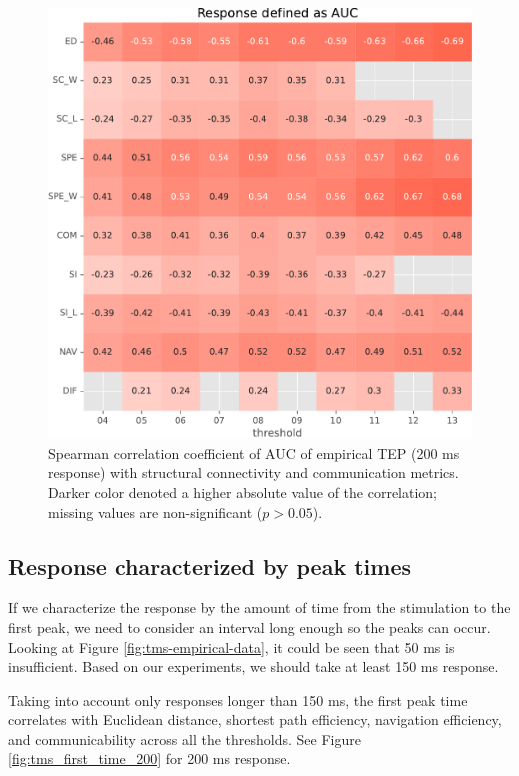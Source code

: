 \begin{figure}
    \centering
    \includegraphics[width=\textwidth]{images/nootebook_generated/pytepfit_results/empirical/200/not_over_threshold_nan/Response defined as AUC.pdf}
    \caption[TEPs AUC (200 ms) correlations]{Spearman correlation coefficient of AUC of empirical TEP (200 ms response) with structural connectivity and communication metrics. Darker color denoted a higher absolute value of the correlation; missing values are non-significant ($p>0.05$).}
    \label{fig:tms_auc_200}
\end{figure}

\subsection{Response characterized by peak times}

If we characterize the response by the amount of time from the stimulation to the first peak, we need to consider an interval long enough so the peaks can occur. Looking at Figure \ref{fig:tms-empirical-data}, it could be seen that 50 ms is insufficient. Based on our experiments, we should take at least 150 ms response. 

Taking into account only responses longer than 150 ms, the first peak time correlates with Euclidean distance, shortest path efficiency, navigation efficiency, and communicability across all the thresholds. See Figure \ref{fig:tms_first_time_200} for 200 ms response.

